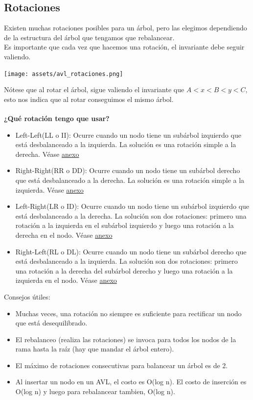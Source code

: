 \documentclass[10pt,a4paper]{article}
\begin{document}
\subsection*{Rotaciones}
Existen muchas rotaciones posibles para un árbol, pero las elegimos dependiendo de la estructura del árbol que tengamos que rebalancear. \\
Es importante que cada vez que hacemos una rotación, el invariante debe seguir valiendo. \\
\begin{center}
    \begin{minipage}[b]{0.7\textwidth}
        \texttt{[image: assets/avl\_rotaciones.png]}
        \centering
        \label{fig:avl_rotaciones}
    \end{minipage}
\end{center}
Nótese que al rotar el árbol, sigue valiendo el invariante que $ A < x < B < y < C $, esto nos indica que al rotar conseguimos el mismo árbol. \\ \\ 
\textbf{¿Qué rotación tengo que usar?}
\begin{itemize}
    \item Left-Left(LL o II): Ocurre cuando un nodo tiene un subárbol izquierdo que está desbalanceado a la izquierda. La solución es una rotación simple a la derecha. Véase \hyperref[subsec:rotaciones_avl]{anexo}
    \item Right-Right(RR o DD): Ocurre cuando un nodo tiene un subárbol derecho que está desbalanceado a la derecha. La solución es una rotación simple a la izquierda. Véase \hyperref[subsec:rotaciones_avl]{anexo}
    \item Left-Right(LR o ID): Ocurre cuando un nodo tiene un subárbol izquierdo que está desbalanceado a la derecha. La solución son dos rotaciones: primero una rotación a la izquierda en el subárbol izquierdo y luego una rotación a la derecha en el nodo. Véase \hyperref[subsec:rotaciones_avl]{anexo} 
    \item Right-Left(RL o DL): Ocurre cuando un nodo tiene un subárbol derecho que está desbalanceado a la izquierda. La solución son dos rotaciones: primero una rotación a la derecha del subárbol derecho y luego una rotación a la izquierda en el nodo. Véase \hyperref[subsec:rotaciones_avl]{anexo}
\end{itemize}
Consejos útiles:
\begin{itemize}
    \item Muchas veces, una rotación no siempre es suficiente para rectificar un nodo que está desequilibrado. 
    \item El rebalanceo (realiza las rotaciones) se invoca para todos los nodos de la rama hasta la raíz (hay que mandar el árbol entero).
    \item El máximo de rotaciones consecutivas para balancear un árbol es de 2.
    \item Al insertar un nodo en un AVL, el costo es O(log n). El costo de inserción es O(log n) y luego para rebalancear tambien, O(log n).
\end{itemize}
\end{document}

